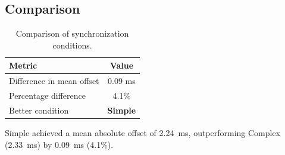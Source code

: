 \subsection*{Comparison}

\begin{table}[h!]
\centering
\begin{tabular}{|l|c|}
\hline
Metric & Value \\
\hline
Difference in mean offset & 0.09 ms \\
Percentage difference & 4.1\% \\
Better condition & \textbf{Simple} \\
\hline
\end{tabular}
\caption{Comparison of synchronization conditions.}
\label{tab:sync_comparison}
\end{table}

Simple achieved a mean absolute offset of 2.24~ms, outperforming Complex (2.33~ms) by 0.09~ms (4.1\%).
